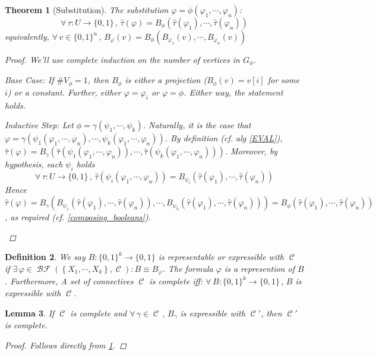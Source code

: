 \documentclass[12pt]{article}
\newcommand{\Forall}[1]{\forall\,{#1}\,,\,}
\newcommand{\Exist}[1]{\exists\,{#1}:}
\newcommand{\seq}[2][0]{\left\{{#1},\cdots,{#2}\right\}}
\DeclareMathOperator{\C}{\mathcal{C}}
\DeclareMathOperator{\BF}{\mathcal{BF}}
\newcommand*{\B}{\{0,1\}}
\newtheorem{theorem}{Theorem}[subsection]
\newtheorem{definition}[theorem]{Definition}
\newtheorem{lemma}[theorem]{Lemma}
\begin{document}
\begin{theorem}[Substitution]
  \label{substitution}
  The substitution $\varphi=\phi(\varphi_1,\cdots,\varphi_n)$: $$\Forall{\tau:U\to\B}\hat{\tau}(\varphi)=B_\phi(\hat{\tau}(\varphi_1),\cdots,\hat{\tau}(\varphi_n))$$
  equivalently, $\Forall{v\in\B^n}B_\varphi(v)=B_\phi(B_{\varphi_1}(v),\cdots,B_{\varphi_n}(v))$
  \begin{proof}
    We'll use complete induction on the number of vertices in $G_\phi$.
    \begin{compactitem}
      \item Base Case: If $\#V_\phi=1$, then $B_\phi$ is either a projection ($B_\phi(v)=v[i]$ for some $i$) or a constant. Further, either $\varphi=\varphi_i$ or $\varphi=\phi$. Either way, the statement holds.
      \item Inductive Step: Let $\phi=\gamma(\psi_1,\cdots,\psi_k)$. Naturally, it is the case that $\varphi=\gamma(\psi_1(\varphi_1,\cdots,\varphi_n),\cdots,\psi_k(\varphi_1,\cdots,\varphi_n))$. By definition (cf. alg \ref{EVAL}), $\hat{\tau}(\varphi)=B_\gamma(\hat{\tau}(\psi_1(\varphi_1,\cdots,\varphi_n)),\cdots,\hat{\tau}(\psi_k(\varphi_1,\cdots,\varphi_n)))$. Moreover, by hypothesis, each $\psi_i$ holds $$\Forall{\tau:U\to\B}\hat{\tau}(\psi_i(\varphi_1,\cdots,\varphi_n))=B_{\psi_i}(\hat{\tau}(\varphi_1),\cdots,\hat{\tau}(\varphi_n))$$ Hence $\hat{\tau}(\varphi)=B_\gamma(B_{\psi_1}(\hat{\tau}(\varphi_1),\cdots,\hat{\tau}(\varphi_n)),\cdots,B_{\psi_k}(\hat{\tau}(\varphi_1),\cdots,\hat{\tau}(\varphi_n)))=B_\phi(\hat{\tau}(\varphi_1),\cdots,\hat{\tau}(\varphi_n))$, as required (cf. \ref{composing_booleans}).
    \end{compactitem}
  \end{proof}
\end{theorem}

\begin{definition}
  We say $B:\B^k\to\B$ is representable or expressible with $\C$ if $\Exist{\varphi\in\BF(\seq[X_1]{X_k},\C)}B\equiv B_\varphi$. The formula $\varphi$ is a represention of $B$. Furthermore, A set of connectives $\C$ is complete iff: $\Forall{B:\B^k\to\B}B $ is expressible with $\C$.
\end{definition}

\begin{lemma}
  If $\C$ is complete and $\Forall{\gamma\in\C} B_\gamma$ is expressible with $\C'$, then $\C'$ is complete.
  \begin{proof}
    Follows directly from \ref{substitution}.
  \end{proof}
\end{lemma}
\end{document}
